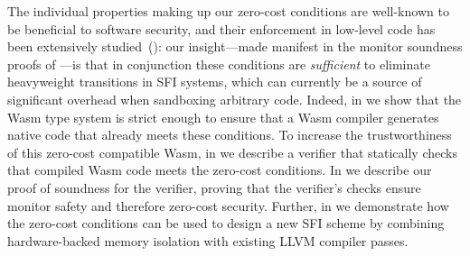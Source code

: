 The individual properties making up our zero-cost conditions are well-known to be beneficial to software security, and their enforcement in low-level code has been extensively studied~(): our insight\dash---made manifest in the monitor
soundness proofs of \dash---is that in
conjunction these conditions are \emph{sufficient} to eliminate heavyweight
transitions in SFI systems, which can currently be a source of significant overhead when sandboxing arbitrary code.
%
Indeed, in  we show that the Wasm
type system is strict enough to ensure that a Wasm compiler generates native
code that already meets these conditions.
%
To increase the trustworthiness of this zero-cost compatible Wasm, in
 we describe a verifier that statically checks
that compiled Wasm code meets the zero-cost conditions.
%
In  we describe our proof of soundness for the
verifier, proving that the verifier's checks ensure monitor safety and therefore
zero-cost security.
%
Further, in  we demonstrate how the zero-cost
conditions can be used to design a new SFI scheme by combining hardware-backed
memory isolation with existing LLVM compiler passes.
